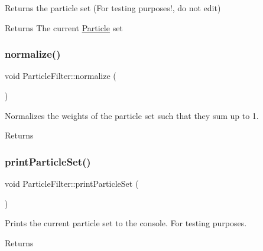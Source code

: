 Returns the particle set (For testing purposes!, do not edit) 

\begin{DoxyReturn}{Returns}
The current \hyperlink{classParticle}{Particle} set 
\end{DoxyReturn}
\mbox{\label{classParticleFilter_aa689bbd14f073aeb1f1a9ef235afcade}} 
\subsubsection{\texorpdfstring{normalize()}{normalize()}}
{\footnotesize\ttfamily void Particle\+Filter\+::normalize (\begin{DoxyParamCaption}{ }\end{DoxyParamCaption})}



Normalizes the weights of the particle set such that they sum up to 1. 

\begin{DoxyReturn}{Returns}

\end{DoxyReturn}
\mbox{\label{classParticleFilter_a84c6ed2f699b9ec2572092ac1d473684}} 
\subsubsection{\texorpdfstring{print\+Particle\+Set()}{printParticleSet()}\hspace{0.1cm}{\footnotesize\ttfamily [1/2]}}
{\footnotesize\ttfamily void Particle\+Filter\+::print\+Particle\+Set (\begin{DoxyParamCaption}{ }\end{DoxyParamCaption})}



Prints the current particle set to the console. For testing purposes. 

\begin{DoxyReturn}{Returns}

\end{DoxyReturn}
\mbox{\label{classParticleFilter_a11f0ce13b31de989935d099ecd264e0f}} 
